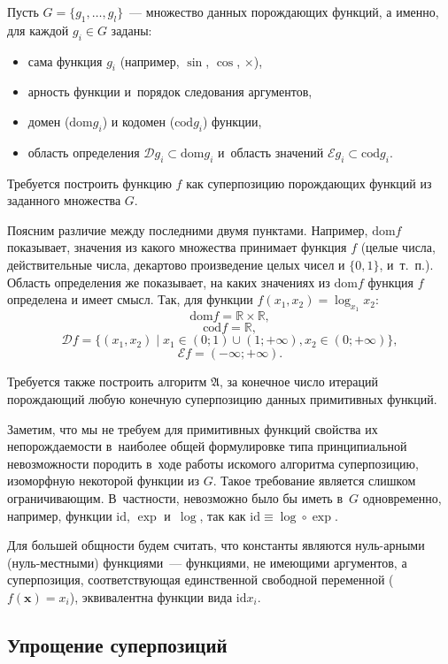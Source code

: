 \documentclass[12pt,a4paper]{article}
\begin{document}
Пусть $G = \{ g_1, \dots, g_l \}$~--- множество данных порождающих
функций, а именно, для каждой $g_i \in G$ заданы:
\begin{itemize}
  \item сама функция $g_i$ (например, $\sin$, $\cos$, $\times$),
  \item арность функции и~порядок следования аргументов,
  \item домен ($\text{dom} g_i$) и кодомен ($\text{cod} g_i$) функции,
  \item область определения $\mathcal{D} g_i \subset \text{dom} g_i$ и~область
	значений $\mathcal{E} g_i \subset \text{cod} g_i$.
\end{itemize}
Требуется построить функцию $f$ как суперпозицию порождающих
функций из заданного множества $G$.

Поясним различие между последними двумя пунктами. Например, $\text{dom} f$
показывает, значения из какого множества принимает функция $f$ (целые числа,
действительные числа, декартово произведение целых чисел и $\{0, 1\}$,
и~т.~п.). Область определения же показывает, на каких значениях из
$\text{dom} f$ функция $f$ определена и имеет смысл. Так, для функции
$f(x_1, x_2) = \log_{x_1} x_2$:
\[
  \text{dom} f = \mathbb{R} \times \mathbb{R},
\]
\[
  \text{cod} f = \mathbb{R},
\]
\[
  \mathcal{D} f = \{ (x_1, x_2) \mid x_1 \in (0; 1) \cup (1; +\infty), x_2 \in (0; +\infty) \},
\]
\[
  \mathcal{E} f = (-\infty; +\infty).
\]

Требуется также построить алгоритм $\mathfrak{A}$, за конечное число итераций
порождающий любую конечную суперпозицию данных примитивных функций.

Заметим, что мы не требуем для примитивных функций свойства их непорождаемости
в~наиболее общей формулировке типа принципиальной невозможности породить
в~ходе работы искомого алгоритма суперпозицию, изоморфную некоторой функции из
$G$. Такое требование является слишком ограничивающим. В~частности, невозможно
было бы иметь в~$G$ одновременно, например, функции $\text{id}$, $\exp$
и~$\log$, так как $\text{id} \equiv \log \circ \exp$.

Для большей общности будем считать, что константы являются
нуль-арными (нуль-местными) функциями~--- функциями, не имеющими
аргументов, а суперпозиция, соответствующая единственной свободной переменной
($f(\mathbf{x}) = x_i$), эквивалентна функции вида $\text{id} x_i$.

\subsection{Упрощение суперпозиций}
\end{document}
